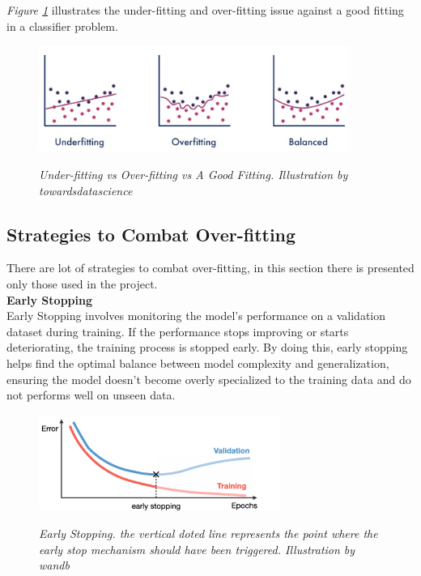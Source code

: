 \textit{Figure \ref{fig:underfitting-overfitting-goodfitting}} illustrates the under-fitting and over-fitting issue against a good fitting in a classifier problem.

\begin{figure}[H]
\centering
\includegraphics[width=0.9\textwidth]{imatges/preliminaries/over-under-base.jpg}
\caption[Under-fitting vs Over-fitting vs Good Fitting]{\textit{Under-fitting vs Over-fitting vs A Good Fitting. Illustration by towardsdatascience}}
{\label{fig:underfitting-overfitting-goodfitting}}
\end{figure}

\subsection{Strategies to Combat Over-fitting}

There are lot of strategies to combat over-fitting, in this section there is presented only those used in the project. \\

\vspace{0.5cm}
\textbf{Early Stopping} \\

Early Stopping involves monitoring the model's performance on a validation dataset during training. If the performance stops improving or starts deteriorating, the training process is stopped early. By doing this, early stopping helps find the optimal balance between model complexity and generalization, ensuring the model doesn't become overly specialized to the training data and do not performs well on unseen data. \\

\begin{figure}[H]
\centering
\includegraphics[width=0.7\textwidth]{imatges/preliminaries/early-stop.png}
\caption[Early Stopping]{\textit{Early Stopping. the vertical doted line represents the point where the early stop mechanism should have been triggered. Illustration by wandb}}
{\label{fig:early-stop}}
\end{figure}

